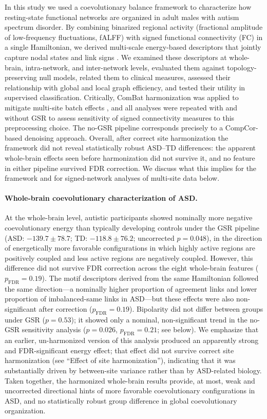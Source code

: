 \documentclass[10pt,letterpaper]{article}
\begin{document}
In this study we used a coevolutionary balance framework to characterize how resting-state
functional networks are organized in adult males with autism spectrum disorder. By combining
binarized regional activity (fractional amplitude of low-frequency fluctuations, fALFF) with
signed functional connectivity (FC) in a single Hamiltonian, we derived multi-scale energy-based
descriptors that jointly capture nodal states and link signs \cite{Heider:1946ac,cartwright1956,
Kargaran:2021he,GhanbarzadehNoudehi2022}. We examined these descriptors at whole-brain, intra-network,
and inter-network levels, evaluated them against topology-preserving null models, related them to
clinical measures, assessed their relationship with global and local graph efficiency, and tested
their utility in supervised classification. Critically, ComBat harmonization was applied to mitigate
multi-site batch effects \cite{Fortin2017,Johnson2007}, and all analyses were repeated with and
without GSR to assess sensitivity of signed connectivity measures to this preprocessing choice.
The no-GSR pipeline corresponds precisely to a CompCor-based denoising approach. Overall, after
correct site harmonization the framework did not reveal statistically robust ASD--TD differences:
the apparent whole-brain effects seen before harmonization did not survive it, and no feature in
either pipeline survived FDR correction. We discuss what this implies for the framework and for
signed-network analyses of multi-site data below.

\paragraph*{Whole-brain coevolutionary characterization of ASD.}
At the whole-brain level, autistic participants showed nominally more negative coevolutionary energy
than typically developing controls under the GSR pipeline (ASD: $-139.7 \pm 78.7$; TD:
$-118.8 \pm 76.2$; uncorrected $p = 0.048$), in the direction of energetically more favorable
configurations in which highly active regions are positively coupled and less active regions are
negatively coupled. However, this difference did not survive FDR correction across the eight
whole-brain features ($p_{\mathrm{FDR}} = 0.19$). The motif descriptors derived from the same
Hamiltonian followed the same direction---a nominally higher proportion of agreement links and lower
proportion of imbalanced-same links in ASD---but these effects were also non-significant after
correction ($p_{\mathrm{FDR}} = 0.19$). Bipolarity did not differ between groups under GSR
($p = 0.53$); it showed only a nominal, non-significant trend in the no-GSR sensitivity analysis
($p = 0.026$, $p_{\mathrm{FDR}} = 0.21$; see below). We emphasize that an earlier, un-harmonized
version of this analysis produced an apparently strong and FDR-significant energy effect; that effect
did not survive correct site harmonization (see ``Effect of site harmonization''), indicating that
it was substantially driven by between-site variance rather than by ASD-related biology. Taken
together, the harmonized whole-brain results provide, at most, weak and uncorrected directional
hints of more favorable coevolutionary configurations in ASD, and no statistically robust group
difference in global coevolutionary organization.
\end{document}
